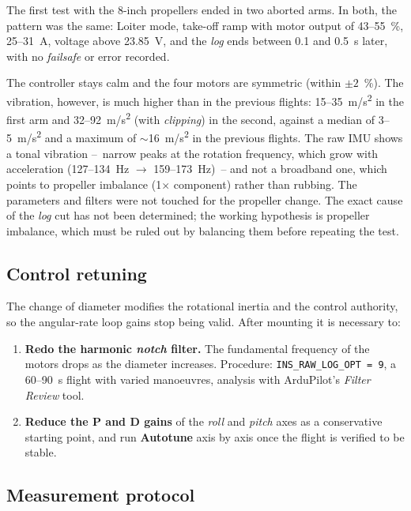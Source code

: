 The first test with the 8-inch propellers ended in two aborted arms. In both, the pattern was the same: Loiter mode, take-off ramp with motor output of 43--55~\%, 25--31~A, voltage above 23.85~V, and the \emph{log} ends between 0.1 and 0.5~s later, with no \emph{failsafe} or error recorded.

The controller stays calm and the four motors are symmetric (within $\pm 2$~\%). The vibration, however, is much higher than in the previous flights: 15--35~m/s\textsuperscript{2} in the first arm and 32--92~m/s\textsuperscript{2} (with \emph{clipping}) in the second, against a median of 3--5~m/s\textsuperscript{2} and a maximum of $\sim$16~m/s\textsuperscript{2} in the previous flights. The raw IMU shows a tonal vibration --~narrow peaks at the rotation frequency, which grow with acceleration (127--134~Hz $\rightarrow$ 159--173~Hz)~-- and not a broadband one, which points to propeller imbalance (1$\times$ component) rather than rubbing. The parameters and filters were not touched for the propeller change. The exact cause of the \emph{log} cut has not been determined; the working hypothesis is propeller imbalance, which must be ruled out by balancing them before repeating the test.

\subsection{Control retuning}
\label{subsec:propulsor-control}

The change of diameter modifies the rotational inertia and the control authority, so the angular-rate loop gains stop being valid. After mounting it is necessary to:

\begin{enumerate}[label=\arabic*.]
    \item \textbf{Redo the harmonic \emph{notch} filter.} The fundamental frequency of the motors drops as the diameter increases. Procedure: \texttt{INS\_RAW\_LOG\_OPT = 9}, a 60--90~s flight with varied manoeuvres, analysis with ArduPilot's \emph{Filter Review} tool.
    \item \textbf{Reduce the P and D gains} of the \emph{roll} and \emph{pitch} axes as a conservative starting point, and run \textbf{Autotune} axis by axis once the flight is verified to be stable.
\end{enumerate}

\subsection{Measurement protocol}
\label{subsec:propulsor-mesura}

